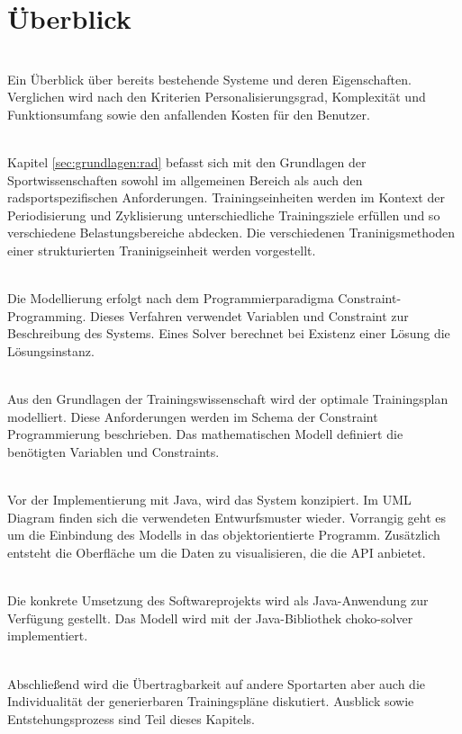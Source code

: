 \section{Überblick}
\label{sec:intro:ueberblick}
\textbf{} \\[0.2em]
Ein Überblick über bereits bestehende Systeme und deren Eigenschaften. Verglichen wird nach den Kriterien Personalisierungsgrad, Komplexität und Funktionsumfang sowie den anfallenden Kosten für den Benutzer.

\textbf{} \\[0.2em]
Kapitel \ref{sec:grundlagen:rad} befasst sich mit den Grundlagen der Sportwissenschaften sowohl im allgemeinen Bereich als auch den radsportspezifischen Anforderungen. Trainingseinheiten werden im Kontext der Periodisierung und Zyklisierung unterschiedliche Trainingsziele erfüllen und so verschiedene Belastungsbereiche abdecken. Die verschiedenen Traninigsmethoden einer strukturierten Traninigseinheit werden vorgestellt.

\textbf{} \\[0.2em]
Die Modellierung erfolgt nach dem Programmierparadigma Constraint-Programming. Dieses Verfahren verwendet Variablen und Constraint zur Beschreibung des Systems. Eines Solver berechnet bei Existenz einer Lösung die Lösungsinstanz. 

\textbf{} \\[0.2em]
Aus den Grundlagen der Trainingswissenschaft wird der optimale Trainingsplan modelliert. Diese Anforderungen werden im Schema der Constraint Programmierung beschrieben. Das mathematischen Modell definiert die benötigten Variablen und Constraints.

\textbf{} \\[0.2em]
Vor der Implementierung mit Java, wird das System konzipiert. Im UML Diagram finden sich die verwendeten Entwurfsmuster wieder. Vorrangig geht es um die Einbindung des Modells in das objektorientierte Programm. Zusätzlich entsteht die Oberfläche um die Daten zu visualisieren, die die API anbietet. 

\textbf{} \\[0.2em]
Die konkrete Umsetzung des Softwareprojekts wird als Java-Anwendung zur Verfügung gestellt. Das Modell wird mit der Java-Bibliothek choko-solver implementiert. 

\textbf{} \\[0.2em]
Abschließend wird die Übertragbarkeit auf andere Sportarten aber auch die Individualität der generierbaren Trainingspläne diskutiert. 
Ausblick sowie Entstehungsprozess sind Teil dieses Kapitels. 